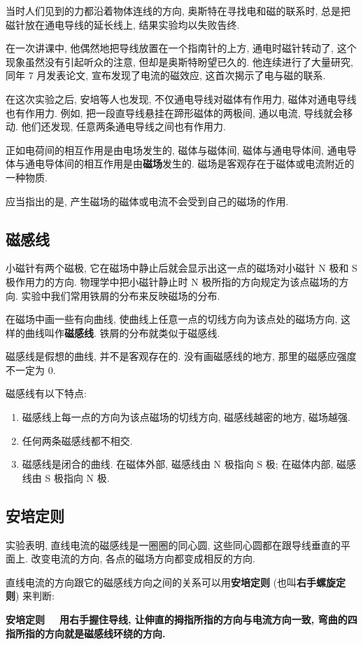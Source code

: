 \documentclass[UTF8,openany,fontset=fandol]{ctexbook}
\theoremstyle{chinesetextbook}
\newcommand{\bre}{\ \ \ }
\begin{document}
当时人们见到的力都沿着物体连线的方向, 奥斯特在寻找电和磁的联系时, 总是把磁针放在通电导线的延长线上, 结果实验均以失败告终.

在一次讲课中, 他偶然地把导线放置在一个指南针的上方, 通电时磁针转动了, 这个现象虽然没有引起听众的注意, 但却是奥斯特盼望已久的. 他连续进行了大量研究, 同年 7 月发表论文, 宣布发现了电流的磁效应, 这首次揭示了电与磁的联系.

在这次实验之后, 安培等人也发现, 不仅通电导线对磁体有作用力, 磁体对通电导线也有作用力. 例如, 把一段直导线悬挂在蹄形磁体的两极间, 通以电流, 导线就会移动. 他们还发现, 任意两条通电导线之间也有作用力.

正如电荷间的相互作用是由电场发生的, 磁体与磁体间, 磁体与通电导体间, 通电导体与通电导体间的相互作用是由\textbf{磁场}发生的. 磁场是客观存在于磁体或电流附近的一种物质.

应当指出的是, 产生磁场的磁体或电流不会受到自己的磁场的作用.
\subsection{磁感线}
小磁针有两个磁极, 它在磁场中静止后就会显示出这一点的磁场对小磁针 N 极和 S 极作用力的方向. 物理学中把小磁针静止时 N 极所指的方向规定为该点磁场的方向. 实验中我们常用铁屑的分布来反映磁场的分布.

在磁场中画一些有向曲线, 使曲线上任意一点的切线方向为该点处的磁场方向, 这样的曲线叫作\textbf{磁感线}. 铁屑的分布就类似于磁感线.

磁感线是假想的曲线, 并不是客观存在的. 没有画磁感线的地方, 那里的磁感应强度不一定为 0.

磁感线有以下特点:
\begin{enumerate}
\item 磁感线上每一点的方向为该点磁场的切线方向, 磁感线越密的地方, 磁场越强.
\item 任何两条磁感线都不相交.
\item 磁感线是闭合的曲线. 在磁体外部, 磁感线由 N 极指向 S 极; 在磁体内部, 磁感线由 S 极指向 N 极.
\end{enumerate}
\subsection{安培定则}
实验表明, 直线电流的磁感线是一圈圈的同心圆, 这些同心圆都在跟导线垂直的平面上. 改变电流的方向, 各点的磁场方向都变成相反的方向.

直线电流的方向跟它的磁感线方向之间的关系可以用\textbf{安培定则} (也叫\textbf{右手螺旋定则}) 来判断:

\textbf{安培定则}\bre \textbf{用右手握住导线, 让伸直的拇指所指的方向与电流方向一致, 弯曲的四指所指的方向就是磁感线环绕的方向.}
\bigskip
\end{document}
